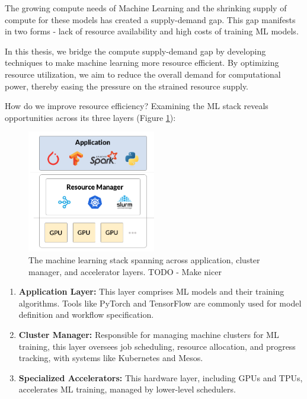 The growing compute needs of Machine Learning and the shrinking supply of compute for these models has created a supply-demand gap. This gap manifests in two forms - lack of resource availability and high costs of training ML models.  

In this thesis, we bridge the compute supply-demand gap by developing techniques to make machine learning more resource efficient. By optimizing resource utilization, we aim to reduce the overall demand for computational power, thereby easing the pressure on the strained resource supply.

How do we improve resource efficiency? Examining the ML stack reveals opportunities across its three layers (Figure \ref{fig:ml_stack}):

\begin{figure}
    \centering
    \includegraphics[width=0.5\textwidth]{intro/figures/MLStack.png}
    \caption{The machine learning stack spanning across application, cluster manager, and accelerator layers. TODO - Make nicer \fillme{}}
    \label{fig:ml_stack}
\end{figure}

\begin{enumerate}
\item \textbf{Application Layer:} This layer comprises ML models and their training algorithms. Tools like PyTorch and TensorFlow are commonly used for model definition and workflow specification.
\item \textbf{Cluster Manager:} Responsible for managing machine clusters for ML training, this layer oversees job scheduling, resource allocation, and progress tracking, with systems like Kubernetes and Mesos.
\item \textbf{Specialized Accelerators:} This hardware layer, including GPUs and TPUs, accelerates ML training, managed by lower-level schedulers.
\end{enumerate}

